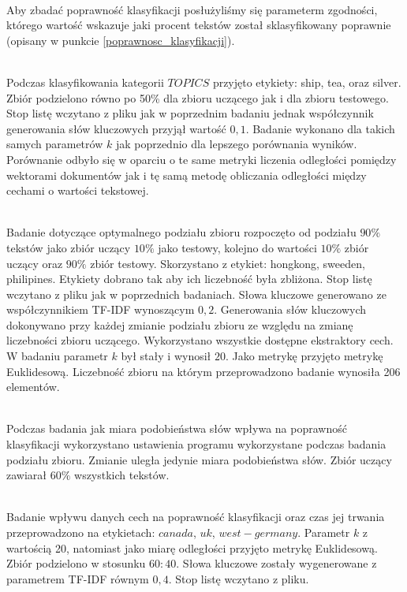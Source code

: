 \documentclass{classrep}
\begin{document}
\\ Aby zbadać poprawność klasyfikacji posłużyliśmy się parameterm zgodności, którego wartość wskazuje
jaki procent tekstów został sklasyfikowany poprawnie (opisany w punkcie \ref{poprawnosc_klasyfikacji}).

\\Podczas klasyfikowania kategorii $TOPICS$ przyjęto etykiety: ship, tea, oraz silver.
Zbiór podzielono równo po 50\% dla zbioru uczącego jak i dla zbioru testowego. Stop listę wczytano z pliku
jak w poprzednim badaniu jednak współczynnik generowania słów kluczowych przyjął wartość $0,1$. Badanie
wykonano dla takich samych parametrów $k$ jak poprzednio dla lepszego porównania wyników. Porównanie odbyło
się w oparciu o te same metryki liczenia odległości pomiędzy wektorami dokumentów jak i tę samą metodę
obliczania odległości między cechami o wartości tekstowej.

\\Badanie dotyczące optymalnego podziału zbioru rozpoczęto od podziału $90\%$ tekstów jako zbiór uczący
$10\%$ jako testowy, kolejno do wartości $10\%$ zbiór uczący oraz $90\%$ zbiór testowy. Skorzystano z
etykiet: hongkong, sweeden, philipines. Etykiety dobrano tak aby ich liczebność była zbliżona.
Stop listę wczytano z pliku jak w poprzednich badaniach. Słowa kluczowe generowano ze współczynnikiem
TF-IDF wynoszącym $0,2$. Generowania słów kluczowych dokonywano przy każdej zmianie podziału zbioru
ze względu na zmianę liczebności zbioru uczącego. Wykorzystano wszystkie dostępne ekstraktory cech.
W badaniu parametr $k$ był
stały i wynosił $20$. Jako metrykę przyjęto metrykę Euklidesową. Liczebność zbioru na którym
przeprowadzono badanie wynosiła 206 elementów.

\\Podczas badania jak miara podobieństwa słów wpływa na poprawność klasyfikacji wykorzystano ustawienia
programu wykorzystane podczas badania podziału zbioru. Zmianie uległa jedynie miara podobieństwa słów.
Zbiór uczący zawiarał $60\%$ wszystkich tekstów.

\\Badanie wpływu danych cech na poprawność klasyfikacji oraz czas jej trwania przeprowadzono na
etykietach: $canada$, $uk$, $west-germany$. Parametr $k$ z wartością 20, natomiast jako miarę odległości
przyjęto metrykę Euklidesową. Zbiór podzielono w stosunku $60:40$. Słowa kluczowe zostały wygenerowane
z parametrem TF-IDF równym $0,4$. Stop listę wczytano z pliku\footnotemark[1].
\end{document}
